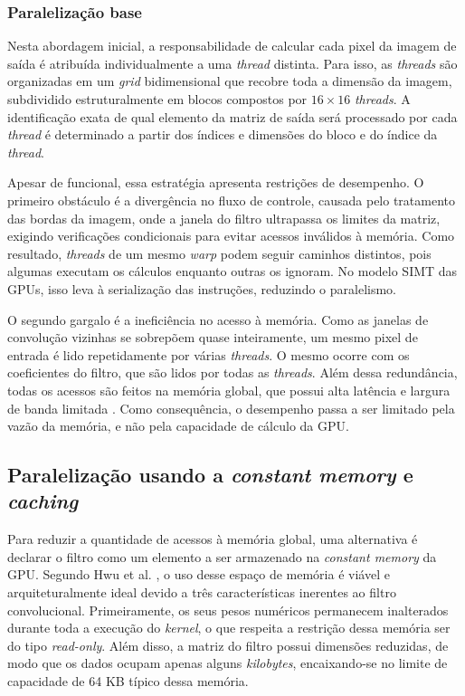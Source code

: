 \documentclass[12pt]{article}
\begin{document}
\subsubsection{Paralelização base}
Nesta abordagem inicial, a responsabilidade de calcular cada pixel da imagem de saída é atribuída individualmente a uma \emph{thread} distinta. Para isso, as \emph{threads} são organizadas em um \emph{grid} bidimensional que recobre toda a dimensão da imagem, subdividido estruturalmente em blocos compostos por $16\times16$ \emph{threads}. A identificação exata de qual elemento da matriz de saída será processado por cada \emph{thread} é determinado a partir dos índices e dimensões do bloco e do índice da \emph{thread}.

Apesar de funcional, essa estratégia apresenta restrições de desempenho. O primeiro obstáculo é a divergência no fluxo de controle, causada pelo tratamento das bordas da imagem, onde a janela do filtro ultrapassa os limites da matriz, exigindo verificações condicionais para evitar acessos inválidos à memória. Como resultado, \emph{threads} de um mesmo \emph{warp} podem seguir caminhos distintos, pois algumas executam os cálculos enquanto outras os ignoram. No modelo SIMT das GPUs, isso leva à serialização das instruções, reduzindo o paralelismo.

O segundo gargalo é a ineficiência no acesso à memória. Como as janelas de convolução vizinhas se sobrepõem quase inteiramente, um mesmo pixel de entrada é lido repetidamente por várias \emph{threads}. O mesmo ocorre com os coeficientes do filtro, que são lidos por todas as \emph{threads}. Além dessa redundância, todas os acessos são feitos na memória global, que possui alta latência e largura de banda limitada \cite{hwu2023}. Como consequência, o desempenho passa a ser limitado pela vazão da memória, e não pela capacidade de cálculo da GPU.

\subsection{Paralelização usando a \emph{constant memory} e \emph{caching}}
Para reduzir a quantidade de acessos à memória global, uma alternativa é declarar o filtro como um elemento a ser armazenado na \emph{constant memory} da GPU. Segundo Hwu et al. \cite{hwu2023}, o uso desse espaço de memória é viável e arquiteturalmente ideal devido a três características inerentes ao filtro convolucional. 
Primeiramente, os seus pesos numéricos permanecem inalterados durante toda a execução do \emph{kernel}, o que respeita a restrição dessa memória ser do tipo \emph{read-only}. Além disso, a matriz do filtro possui dimensões reduzidas, de modo que os dados ocupam apenas alguns \emph{kilobytes}, encaixando-se no limite de capacidade de 64 KB típico dessa memória. 
\end{document}
